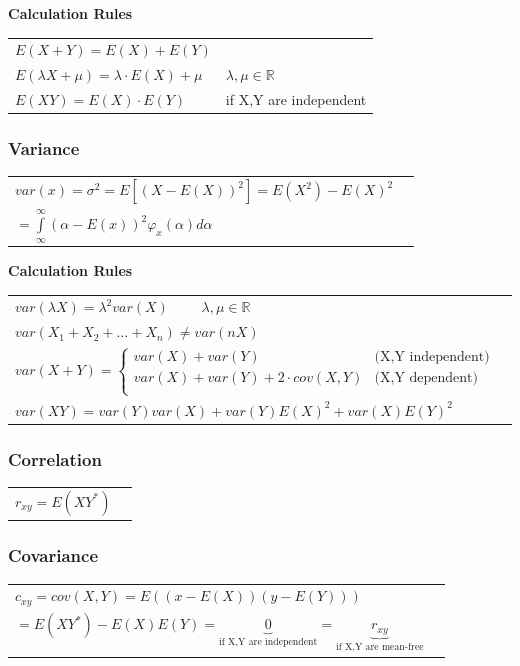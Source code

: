 			\textbf{Calculation Rules}\\
				\begin{tabular}{ll}
				$E(X+Y)=E(X)+E(Y)$\\
				$E(\lambda X + \mu)=\lambda \cdot E(X) + \mu$ & $\lambda, \mu \in \mathbb{R}$\\
				$E(XY) = E(X)\cdot E(Y)$ & if X,Y are independent\\
				\end{tabular}


		\subsubsection{Variance}

			\begin{tabular}{ll}
			$var(x)=\sigma ^2=E[(X-E(X))^2]=E(X^2)-E(X)^2$\\$=\int\limits_\infty^\infty(\alpha - E(x))^2\varphi_x(\alpha)d\alpha$\\
			\end{tabular}

			\textbf{Calculation Rules}\\
				\begin{tabular}{ll}
				$var(\lambda X)=\lambda^2 var(X) \qquad $ $\lambda, \mu \in
				\mathbb{R}$\\
				$var(X_1+X_2+\ldots+X_n) \neq var(n X)$ \\
				$var(X+Y)= \begin{cases}
								var(X)+var(Y)
								&   \text{(X,Y independent)}\\
								var(X) + var(Y) + 2 \cdot cov(X,Y)
								&   \text{(X,Y dependent)}\\
							\end{cases} $ \\
				$var(X Y)= var(Y)var(X)+var(Y)E(X)^2+var(X)E(Y)^2$
				\end{tabular}

		\subsubsection{Correlation}
		\begin{tabular}{ll}
        $r_{xy}=E(XY^*)$
        \end{tabular}
		\subsubsection{Covariance}
		\begin{tabular}{ll}
			$c_{xy}=cov(X,Y)=E((x-E(X))(y-E(Y)))$\\$=E(XY^*)-E(X)E(Y)=\underbrace{0}_{\text{if X,Y are independent}}=
			\underbrace{r_{xy}}_{\text{if X,Y are mean-free}}$
		\end{tabular}
